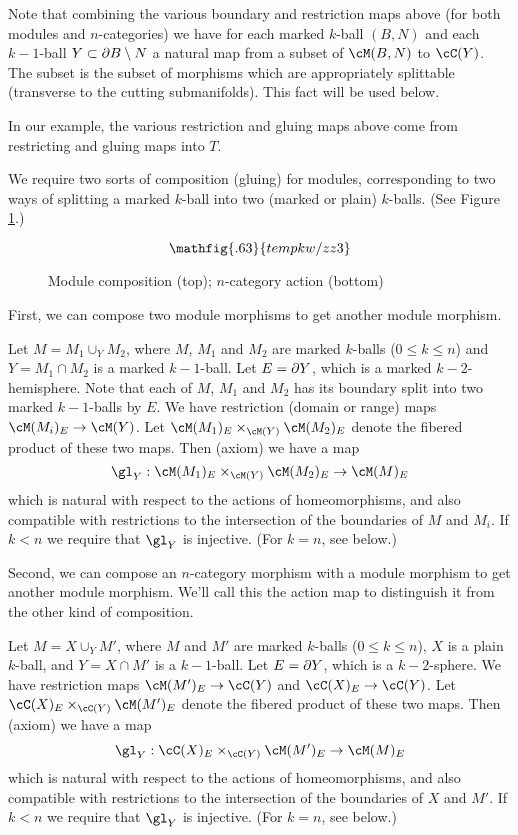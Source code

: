 Note that combining the various boundary and restriction maps above
(for both modules and $n$-categories)
we have for each marked $k$-ball $(B, N)$ and each $k{-}1$-ball $Y\subset \partial B \setminus N$
a natural map from a subset of $\cM(B, N)$ to $\cC(Y)$.
The subset is the subset of morphisms which are appropriately splittable (transverse to the
cutting submanifolds).
This fact will be used below.

In our example, the various restriction and gluing maps above come from
restricting and gluing maps into $T$.

We require two sorts of composition (gluing) for modules, corresponding to two ways
of splitting a marked $k$-ball into two (marked or plain) $k$-balls.
(See Figure \ref{zzz3}.)

\begin{figure}[!ht]
\begin{equation*}
\mathfig{.63}{tempkw/zz3}
\end{equation*}
\caption{Module composition (top); $n$-category action (bottom)}
\label{zzz3}
\end{figure}

First, we can compose two module morphisms to get another module morphism.

{Let $M = M_1 \cup_Y M_2$, where $M$, $M_1$ and $M_2$ are marked $k$-balls ($0\le k\le n$)
and $Y = M_1\cap M_2$ is a marked $k{-}1$-ball.
Let $E = \partial Y$, which is a marked $k{-}2$-hemisphere.
Note that each of $M$, $M_1$ and $M_2$ has its boundary split into two marked $k{-}1$-balls by $E$.
We have restriction (domain or range) maps $\cM(M_i)_E \to \cM(Y)$.
Let $\cM(M_1)_E \times_{\cM(Y)} \cM(M_2)_E$ denote the fibered product of these two maps. 
Then (axiom) we have a map
\[
	\gl_Y : \cM(M_1)_E \times_{\cM(Y)} \cM(M_2)_E \to \cM(M)_E
\]
which is natural with respect to the actions of homeomorphisms, and also compatible with restrictions
to the intersection of the boundaries of $M$ and $M_i$.
If $k < n$ we require that $\gl_Y$ is injective.
(For $k=n$, see below.)}



Second, we can compose an $n$-category morphism with a module morphism to get another
module morphism.
We'll call this the action map to distinguish it from the other kind of composition.

{Let $M = X \cup_Y M'$, where $M$ and $M'$ are marked $k$-balls ($0\le k\le n$),
$X$ is a plain $k$-ball,
and $Y = X\cap M'$ is a $k{-}1$-ball.
Let $E = \partial Y$, which is a $k{-}2$-sphere.
We have restriction maps $\cM(M')_E \to \cC(Y)$ and $\cC(X)_E\to \cC(Y)$.
Let $\cC(X)_E \times_{\cC(Y)} \cM(M')_E$ denote the fibered product of these two maps. 
Then (axiom) we have a map
\[
	\gl_Y :\cC(X)_E \times_{\cC(Y)} \cM(M')_E \to \cM(M)_E
\]
which is natural with respect to the actions of homeomorphisms, and also compatible with restrictions
to the intersection of the boundaries of $X$ and $M'$.
If $k < n$ we require that $\gl_Y$ is injective.
(For $k=n$, see below.)}


